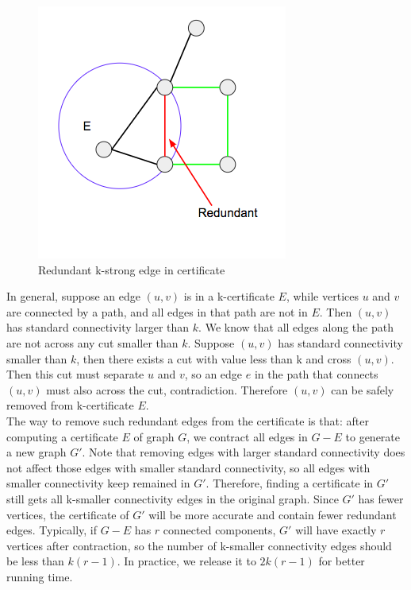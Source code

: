\documentclass{article}
\begin{document}
\begin{figure}[h!]
\centering
\includegraphics[scale=0.4]{images/redundant_edge.png}
\caption{Redundant k-strong edge in certificate}
\label{fig:redundant_strong}
\end{figure}

In general, suppose an edge $(u, v)$ is in a k-certificate $E$, while vertices $u$ and $v$ are connected by a path, and all edges in that path are not in $E$. Then $(u, v)$ has standard connectivity larger than $k$.
We know that all edges along the path are not across any cut smaller than $k$. 
Suppose $(u, v)$ has standard connectivity smaller than $k$, then there exists a cut with value less than k and cross $(u, v)$. Then this cut must separate $u$ and $v$, so an edge $e$ in the path that connects $(u, v)$ must also across the cut, contradiction.
Therefore $(u, v)$ can be safely removed from k-certificate $E$. \\

The way to remove such redundant edges from the certificate is that: after computing a certificate $E$ of graph $G$, we contract all edges in $G-E$ to generate a new graph $G'$. 
Note that removing edges with larger standard connectivity does not affect those edges with smaller standard connectivity, so all edges with smaller connectivity keep remained in $G'$. Therefore, finding a certificate in $G'$ still gets all k-smaller connectivity edges in the original graph. 
Since $G'$ has fewer vertices, the certificate of $G'$ will be more accurate and contain fewer redundant edges. Typically, if $G-E$ has $r$ connected components, $G'$ will have exactly $r$ vertices after contraction, so the number of k-smaller connectivity edges should be less than $k(r-1)$. In practice, we release it to $2k(r-1)$ for better running time. \\
\end{document}
